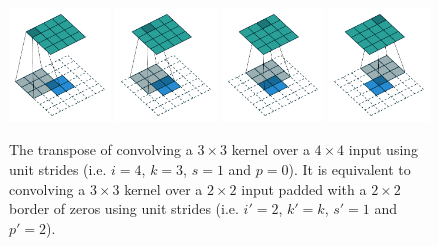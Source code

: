 \documentclass{report}
\begin{document}
\begin{figure}[p]
    \centering
    \includegraphics[width=0.24\textwidth]{pdf/no_padding_no_strides_transposed_00.pdf}
    \includegraphics[width=0.24\textwidth]{pdf/no_padding_no_strides_transposed_01.pdf}
    \includegraphics[width=0.24\textwidth]{pdf/no_padding_no_strides_transposed_02.pdf}
    \includegraphics[width=0.24\textwidth]{pdf/no_padding_no_strides_transposed_03.pdf}
    \caption{\label{fig:no_padding_no_strides_transposed} The transpose of
        convolving a $3 \times 3$ kernel over a $4 \times 4$ input using unit
        strides (i.e. $i = 4$, $k = 3$, $s = 1$ and $p = 0$). It is equivalent
        to convolving a $3 \times 3$ kernel over a $2 \times 2$ input padded
        with a $2 \times 2$ border of zeros using unit strides (i.e. $i' = 2$,
        $k' = k$, $s' = 1$ and $p' = 2$).}
\end{figure}
\end{document}
